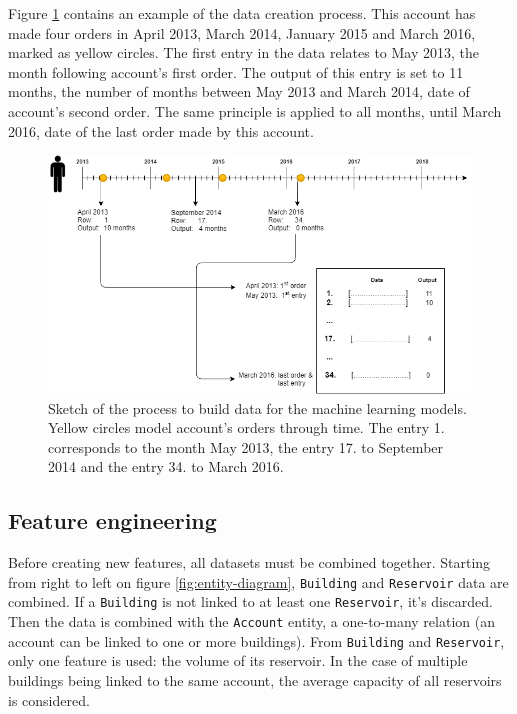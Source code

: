 Figure \ref{fig:data-build-example} contains an example of the data creation process. This account has made four orders in April 2013, March 2014, January 2015 and March 2016, marked as yellow circles. The first entry in the data relates to May 2013, the month following account's first order. The output of this entry is set to 11 months, the number of months between May 2013 and March 2014, date of account's second order. The same principle is applied to all months, until March 2016, date of the last order made by this account.

\begin{figure}[h]
    \includegraphics[width=15cm]{images/data-build-ml-example_2.png}
    \caption[Process to build data for machine learning]{Sketch of the process to build data for the machine learning models. Yellow circles model account's orders through time. The entry 1. corresponds to the month May 2013, the entry 17. to September 2014 and the entry 34. to March 2016.}
    \label{fig:data-build-example}
\end{figure}


\subsection{Feature engineering}\label{sec:ml-features}

Before creating new features, all datasets must be combined together. Starting from right to left on figure \ref{fig:entity-diagram}, \texttt{Building} and \texttt{Reservoir} data are combined. If a \texttt{Building} is not linked to at least one \texttt{Reservoir}, it's discarded. Then the data is combined with the \texttt{Account} entity, a one-to-many relation (an account can be linked to one or more buildings). From \texttt{Building} and \texttt{Reservoir}, only one feature is used: the volume of its reservoir. In the case of multiple buildings being linked to the same account, the average capacity of all reservoirs is considered.

